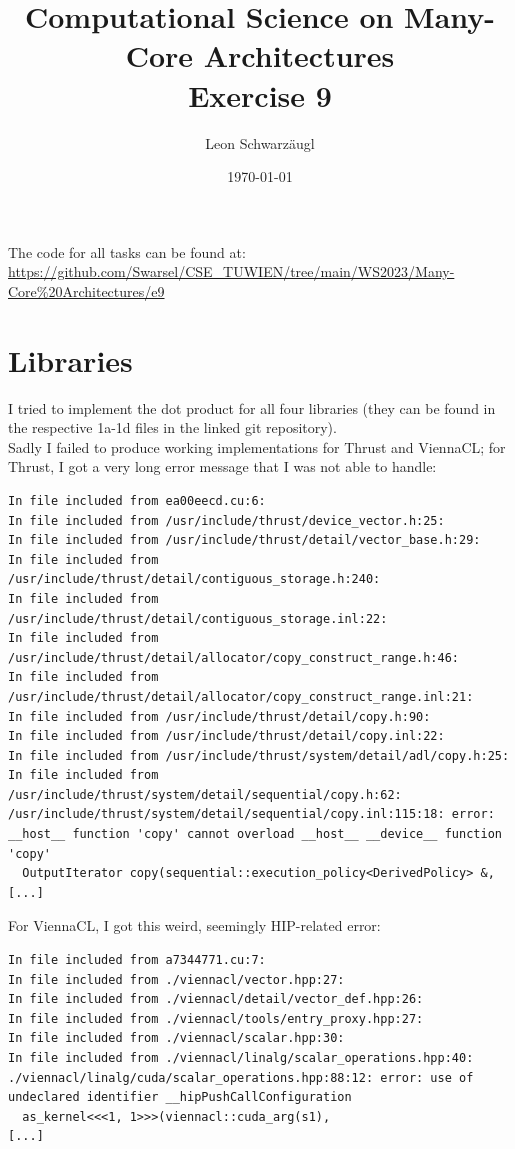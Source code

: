 \documentclass[11pt]{article}
\author{Leon Schwarzäugl}
\date{\today}
\title{Computational Science on Many-Core Architectures \\Exercise 9}
\begin{document}
\maketitle
The code for all tasks can be found at: \url{https://github.com/Swarsel/CSE_TUWIEN/tree/main/WS2023/Many-Core%20Architectures/e9}

\newpage
\section{Libraries}

I tried to implement the dot product for all four libraries (they can be found in the respective 1a-1d files in the linked git repository). \\
Sadly I failed to produce working implementations for Thrust and ViennaCL; for Thrust, I got a very long error message that I was not able to handle:

\begin{tiny}
\begin{verbatim}
In file included from ea00eecd.cu:6:
In file included from /usr/include/thrust/device_vector.h:25:
In file included from /usr/include/thrust/detail/vector_base.h:29:
In file included from /usr/include/thrust/detail/contiguous_storage.h:240:
In file included from /usr/include/thrust/detail/contiguous_storage.inl:22:
In file included from /usr/include/thrust/detail/allocator/copy_construct_range.h:46:
In file included from /usr/include/thrust/detail/allocator/copy_construct_range.inl:21:
In file included from /usr/include/thrust/detail/copy.h:90:
In file included from /usr/include/thrust/detail/copy.inl:22:
In file included from /usr/include/thrust/system/detail/adl/copy.h:25:
In file included from /usr/include/thrust/system/detail/sequential/copy.h:62:
/usr/include/thrust/system/detail/sequential/copy.inl:115:18: error: __host__ function 'copy' cannot overload __host__ __device__ function 'copy'
  OutputIterator copy(sequential::execution_policy<DerivedPolicy> &,
[...]
\end{verbatim}
\end{tiny}
For ViennaCL, I got this weird, seemingly HIP-related error:

\begin{tiny}
\begin{verbatim}
In file included from a7344771.cu:7:
In file included from ./viennacl/vector.hpp:27:
In file included from ./viennacl/detail/vector_def.hpp:26:
In file included from ./viennacl/tools/entry_proxy.hpp:27:
In file included from ./viennacl/scalar.hpp:30:
In file included from ./viennacl/linalg/scalar_operations.hpp:40:
./viennacl/linalg/cuda/scalar_operations.hpp:88:12: error: use of undeclared identifier __hipPushCallConfiguration
  as_kernel<<<1, 1>>>(viennacl::cuda_arg(s1),
[...]
\end{verbatim}
\end{tiny}
\end{document}
